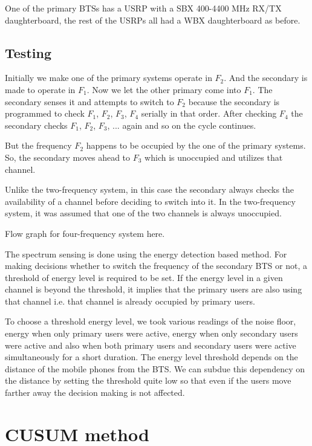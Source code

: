 One of the primary BTSs has a USRP with a SBX 400-4400 MHz RX/TX 
daughterboard, the rest of the USRPs all had a WBX daughterboard as before.

\subsection{Testing}

Initially we make one of the primary systems operate in $F_2$. And the 
secondary is made to operate in $F_1$. Now we let the other primary come into 
$F_1$. The secondary senses it and attempts to switch to $F_2$ because the 
secondary is programmed to check $F_1$, $F_2$, $F_3$, $F_4$ serially in that 
order. After checking $F_4$ the secondary checks $F_1$, $F_2$, $F_3$, ... 
again and so on the cycle continues.

But the frequency $F_2$ happens to be occupied by the one of the primary 
systems. So, the secondary moves ahead to $F_3$ which is unoccupied and 
utilizes that channel.

Unlike the two-frequency system, in this case the secondary always checks 
the availability of a channel before deciding to switch into it. In the 
two-frequency system, it was assumed that one of the two channels is always
unoccupied.

Flow graph for four-frequency system here.

The spectrum sensing is done using the energy detection based method. For 
making decisions whether to switch the frequency of the secondary BTS or not, 
a threshold of energy level is required to be set. If the energy level in a 
given channel is beyond the threshold, it implies that the primary users are
also using that channel i.e. that channel is already occupied by primary 
users.

To choose a threshold energy level, we took various readings of the noise 
floor, energy when only primary users were active, energy when only secondary 
users were active and also when both primary users and secondary users were 
active simultaneously for a short duration. The energy level threshold depends
on the distance of the mobile phones from the BTS. We can subdue this 
dependency on the distance by setting the threshold quite low so that even if
the users move farther away the decision making is not affected.

\section{CUSUM method}


